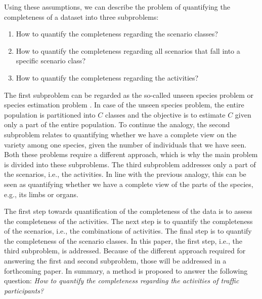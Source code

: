 Using these assumptions, we can describe the problem of quantifying the completeness of a dataset into three subproblems:
\begin{enumerate}
	\item How to quantify the completeness regarding the scenario classes?
	\item How to quantify the completeness regarding all scenarios that fall into a specific scenario class?
	\item How to quantify the completeness regarding the activities?
\end{enumerate}

The first subproblem can be regarded as the so-called unseen species problem \cite{bunge1993estimating, gandolfi2004nonparametric} or species estimation problem \cite{yang2012estimating}. In case of the unseen species problem, the entire population is partitioned into $C$ classes and the objective is to estimate $C$ given only a part of the entire population. To continue the analogy, the second subproblem relates to quantifying whether we have a complete view on the variety among one species, given the number of individuals that we have seen. Both these problems require a different approach, which is why the main problem is divided into these subproblems. The third subproblem addresses only a part of the scenarios, i.e., the activities. In line with the previous analogy, this can be seen as quantifying whether we have a complete view of the parts of the species, e.g., its limbs or organs.

The first step towards quantification of the completeness of the data is to assess the completeness of the activities. The next step is to quantify the completeness of the scenarios, i.e., the combinations of activities. The final step is to quantify the completeness of the scenario classes. In this paper,  the first step, i.e., the third subproblem, is addressed. Because of the different approach required for answering the first and second subproblem, those will be addressed in a forthcoming paper. In summary, a method is proposed to answer the following question:
\emph{How to quantify the completeness regarding the activities of traffic participants?}
